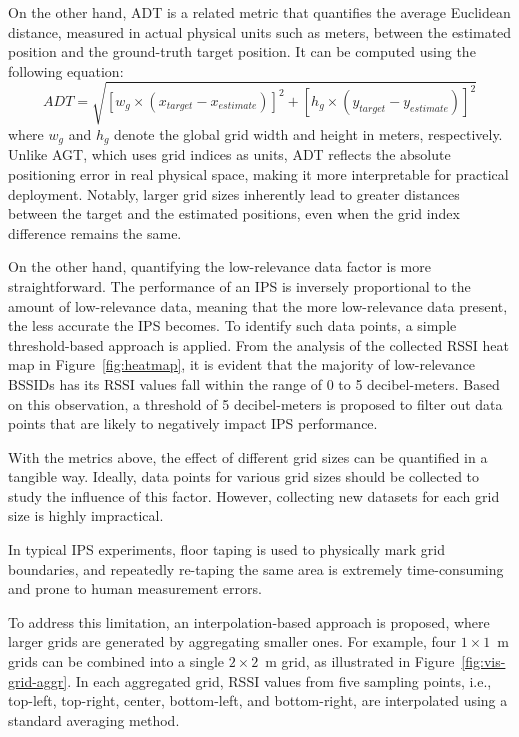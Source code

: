 \documentclass[runningheads]{llncs}
\begin{document}
On the other hand, ADT is a related metric that quantifies the average Euclidean distance, measured in actual physical units such as meters, between the estimated position and the ground-truth target position. It can be computed using the following equation:
\begin{equation}
        ADT = \sqrt{[w_{g} \times (x_{target} - x_{estimate})]^2 + [h_{g} \times (y_{target} - y_{estimate})]^2}
\end{equation}
where $w_{g}$ and $h_{g}$ denote the global grid width and height in meters, respectively. Unlike AGT, which uses grid indices as units, ADT reflects the absolute positioning error in real physical space, making it more interpretable for practical deployment. Notably, larger grid sizes inherently lead to greater distances between the target and the estimated positions, even when the grid index difference remains the same.

On the other hand, quantifying the low-relevance data factor is more straightforward. The performance of an IPS is inversely proportional to the amount of low-relevance data, meaning that the more low-relevance data present, the less accurate the IPS becomes. To identify such data points, a simple threshold-based approach is applied. From the analysis of the collected RSSI heat map in Figure~\ref{fig:heatmap}, it is evident that the majority of low-relevance BSSIDs has its RSSI values fall within the range of 0 to 5 decibel-meters. Based on this observation, a threshold of 5 decibel-meters is proposed to filter out data points that are likely to negatively impact IPS performance.

With the metrics above, the effect of different grid sizes can be quantified in a tangible way. Ideally, data points for various grid sizes should be collected to study the influence of this factor. However, collecting new datasets for each grid size is highly impractical.

In typical IPS experiments, floor taping is used to physically mark grid boundaries, and repeatedly re-taping the same area is extremely time-consuming and prone to human measurement errors.
 
To address this limitation, an interpolation-based approach is proposed, where larger grids are generated by aggregating smaller ones. For example, four $1 \times 1$~m grids can be combined into a single $2 \times 2$~m grid, as illustrated in Figure~\ref{fig:vis-grid-aggr}. In each aggregated grid, RSSI values from five sampling points, i.e., top-left, top-right, center, bottom-left, and bottom-right, are interpolated using a standard averaging method.
\end{document}
